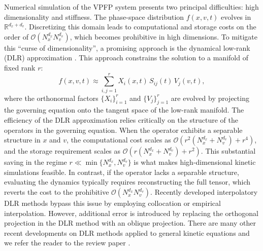 \documentclass[]{article}
\numberwithin{equation}{section}
\begin{document}
Numerical simulation of the VPFP system presents two principal difficulties: high dimensionality and stiffness. The phase-space distribution \(f(x,v,t)\) evolves in $\mathbb{R}^{d_x+d_v}$. Discretizing this domain leads to computational and storage costs on the order of \(\mathcal{O}(N_x^{d_x} N_v^{d_v})\), which becomes prohibitive in high dimensions. To mitigate this ``curse of dimensionality'', a promising approach is the dynamical low-rank (DLR) approximation \cite{koch2007dynamical, lubich2014projector}. 
This approach constrains the solution to a manifold of fixed rank \(r\):
\[
f(x,v,t) \approx \sum_{i,j=1}^r X_i(x,t)\, S_{ij}(t)\, V_j(v,t),
\]
where the orthonormal factors \(\{X_i\}_{i=1}^{r}\) and \(\{V_j\}_{j=1}^{r}\) are evolved by projecting the governing equation onto the tangent space of the low-rank manifold. 
The efficiency of the DLR approximation relies critically on the structure of the operators in the governing equation. When the operator exhibits a separable structure in $x$ and $v$, the computational cost scales as $\mathcal{O}(r^2(N_x^{d_x} + N_v^{d_v}) + r^4)$, and the storage requirement scales as $\mathcal{O}(r(N_x^{d_x} + N_v^{d_v}) + r^2)$. This substantial saving in the regime $r \ll \min\{N_x^{d_x}, N_v^{d_v}\}$ is what makes high-dimensional kinetic simulations feasible. In contrast, if the operator lacks a separable structure, evaluating the dynamics typically requires reconstructing the full tensor, which reverts the cost to the prohibitive $\mathcal{O}(N_x^{d_x} N_v^{d_v})$. Recently developed interpolatory DLR methods \cite{carrel2025interpolatory, dektor2025interpolatory} bypass this issue by employing collocation or empirical interpolation. However, additional error is introduced by replacing the orthogonal projection in the DLR method with an oblique projection. There are many other recent developments on DLR methods applied to general kinetic equations and we refer the reader to the review paper \cite{EKKMQ25}.
\end{document}

